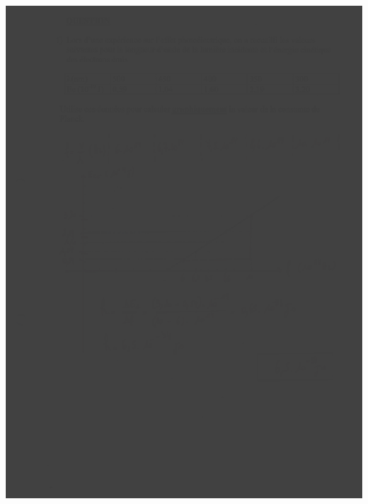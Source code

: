 {{{\includegraphics[width=17.498cm,height=24.13cm]{Pictures/10000001000002570000033BD2AA64816C97C97B.png}

}}}
